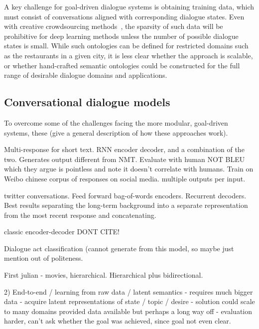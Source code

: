\documentclass[11pt,letterpaper]{article}
\begin{document}
A key challenge for goal-driven dialogue systems is obtaining training data, which must consist of conversations aligned with corresponding dialogue states. Even with creative crowdsourcing methods~\cite{wen2016network}, the sparsity of such data will be prohibitive for deep learning methods unless the number of possible dialogue states is small. While such ontologies can be defined for restricted domains such as the restaurants in a given city, it is less clear whether the approach is scalable, or whether hand-crafted semantic ontologies could be constructed for the full range of desirable dialogue domains and applications. 


\subsection{Conversational dialogue models}
To overcome some of the challenges facing the more modular, goal-driven systems, these (give a general description of how these approaches work). 



\cite{shang2015neural} Multi-response for short text. RNN encoder decoder, and a combination of the two. Generates output different from NMT. Evaluate with human NOT BLEU which they argue is pointless and note it doesn't correlate with humans. Train on Weibo chinese corpus of responses on social media. multiple outputs per input. 

\cite{sordoni2015neural} twitter conversations. Feed forward bag-of-words encoders. Recurrent decoders. Best results separating the long-term background into a separate representation from the most recent response and concatenating. 

\cite{vinyals2015neural} classic encoder-decoder DONT CITE!

\cite{kalchbrenner2013recurrent} Dialogue act classification (cannot generate from this model, so maybe just mention out of politeness. 



\cite{serban2016building} First julian - movies, hierarchical. Hierarchical plus bidirectional. 

2) End-to-end / learning from raw data / latent semantics
- requires much bigger data
- acquire latent representations of state / topic / desire
- solution could scale to many domains provided data available but perhaps a long way off
- evaluation harder, can't ask whether the goal was achieved, since goal not even clear. 
\end{document}
